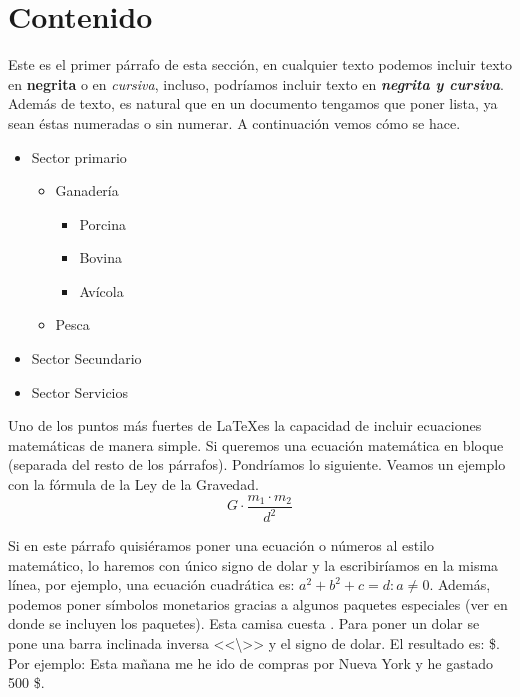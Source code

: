 \documentclass{article}
\begin{document}
\section{Contenido}

Este es el primer párrafo de esta sección, en cualquier texto
podemos incluir texto en
\textbf{negrita} o en \textit{cursiva}, incluso, podríamos incluir texto en 
\textbf{\textit{negrita y cursiva}}. Además de texto, es natural que en un 
documento tengamos que poner lista, ya sean éstas numeradas o sin numerar.
A continuación vemos cómo se hace.

\begin{itemize}
    \item Sector primario
    \begin{itemize}
        \item Ganadería
        \begin{itemize}
            \item Porcina
            \item Bovina
            \item Avícola
        \end{itemize}
        \item Pesca
    \end{itemize}
    \item Sector Secundario
    \item Sector Servicios
\end{itemize}

Uno de los puntos más fuertes de \LaTeX es la capacidad de incluir ecuaciones
matemáticas de manera simple. Si queremos una ecuación matemática en bloque
(separada del resto de los párrafos). Pondríamos lo siguiente. Veamos un
ejemplo con la fórmula de la Ley de la Gravedad.
$$
G\cdot\frac{m_1\cdot m_2}{d^2}
$$

Si en este párrafo quisiéramos poner una ecuación o números al estilo 
matemático, lo haremos con único signo de dolar y la escribiríamos
en la misma línea, por ejemplo, una ecuación cuadrática es: 
$a^2+b^2+c = d : a \ne 0$.
Además, podemos poner símbolos monetarios gracias a algunos paquetes especiales
(ver en donde se incluyen los paquetes). Esta camisa cuesta
. Para poner un dolar se pone una barra inclinada inversa 
<<\textbackslash>> y el signo de dolar. El resultado es: \$. Por ejemplo:
Esta mañana me he ido de compras por Nueva York y he gastado 500 \$.
\end{document}
